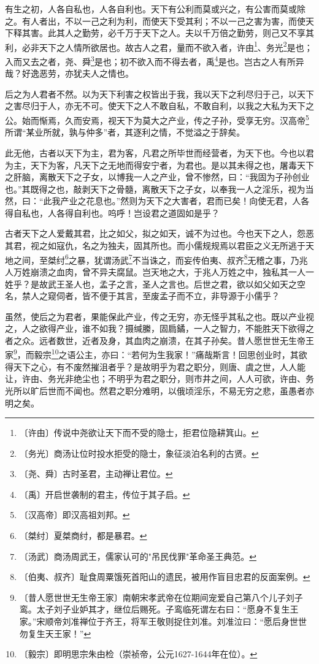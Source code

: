 \documentclass[12pt,UTF-8,openany,a4]{ctexbook}
\begin{document}
\begin{large}
    
    有生之初，人各自私也，人各自利也。天下有公利而莫或兴之，有公害而莫或除之。有人者出，不以一己之利为利，而使天下受其利；不以一己之害为害，而使天下释其害。此其人之勤劳，必千万于天下之人。夫以千万倍之勤劳，则己又不享其利，必非天下之人情所欲居也。故古人之君，量而不欲入者，许由\footnote{〔许由〕\yiwen 传说中尧欲让天下而不受的隐士，拒君位隐耕箕山。}、务光\footnote{〔务光〕\yiwen 商汤让位时投水拒受的隐士，象征淡泊名利的古贤。}是也；入而又去之者，尧、舜\footnote{〔尧、舜〕\yiwen 古时圣君，主动禅让君位。}是也；初不欲入而不得去者，禹\footnote{〔禹〕\yiwen 开启世袭制的君主，传位于其子启。}是也。岂古之人有所异哉？好逸恶劳，亦犹夫人之情也。
    
    后之为人君者不然。以为天下利害之权皆出于我，我以天下之利尽归于己，以天下之害尽归于人，亦无不可。使天下之人不敢自私，不敢自利，以我之大私为天下之公。始而惭焉，久而安焉，视天下为莫大之产业，传之子孙，受享无穷。汉高帝\footnote{〔汉高帝〕\yiwen 即汉高祖刘邦。}所谓“某业所就，孰与仲多”者，其逐利之情，不觉溢之于辞矣。
    
    此无他，古者以天下为主，君为客，凡君之所毕世而经营者，为天下也。今也以君为主，天下为客，凡天下之无地而得安宁者，为君也。是以其未得之也，屠毒天下之肝脑，离散天下之子女，以博我一人之产业，曾不惨然，曰：“我固为子孙创业也。”其既得之也，敲剥天下之骨髓，离散天下之子女，以奉我一人之淫乐，视为当然，曰：“此我产业之花息也。”然则为天下之大害者，君而已矣！向使无君，人各得自私也，人各得自利也。呜呼！岂设君之道固如是乎？
    
    古者天下之人爱戴其君，比之如父，拟之如天，诚不为过也。今也天下之人，怨恶其君，视之如寇仇，名之为独夫，固其所也。而小儒规规焉以君臣之义无所逃于天地之间，至桀纣\footnote{〔桀纣〕\yiwen 夏桀商纣，都是暴君。}之暴，犹谓汤武\footnote{〔汤武〕\yiwen 商汤周武王，儒家认可的"吊民伐罪"革命圣王典范。}不当诛之，而妄传伯夷、叔齐\footnote{〔伯夷、叔齐〕\yiwen 耻食周粟饿死首阳山的遗民，被用作盲目忠君的反面案例。}无稽之事，乃兆人万姓崩溃之血肉，曾不异夫腐鼠。岂天地之大，于兆人万姓之中，独私其一人一姓乎？是故武王圣人也，孟子之言，圣人之言也。后世之君，欲以如父如天之空名，禁人之窥伺者，皆不便于其言，至废孟子而不立，非导源于小儒乎？
    
    虽然，使后之为君者，果能保此产业，传之无穷，亦无怪乎其私之也。既以产业视之，人之欲得产业，谁不如我？摄缄縢，固扃鐍，一人之智力，不能胜天下欲得之者之众。远者数世，近者及身，其血肉之崩溃，在其子孙矣。昔人愿世世无生帝王家\footnote{〔昔人愿世世无生帝王家〕\yiwen 南朝宋孝武帝在位期间宠爱自己第八个儿子刘子鸾。太子刘子业妒其才，继位后赐死。子鸾临死谓左右曰：“愿身不复生王家。”宋顺帝刘准禅位于齐王，将军王敬则捉住刘准。刘准泣曰：“愿后身世世勿复生天王家！”}，而毅宗\footnote{〔毅宗〕\yiwen 即明思宗朱由检（崇祯帝，公元1627-1644年在位）。}之语公主，亦曰：“若何为生我家！”痛哉斯言！回思创业时，其欲得天下之心，有不废然摧沮者乎？是故明乎为君之职分，则唐、虞之世，人人能让，许由、务光非绝尘也；不明乎为君之职分，则市井之间，人人可欲，许由、务光所以旷后世而不闻也。然君之职分难明，以俄顷淫乐，不易无穷之悲，虽愚者亦明之矣。
\end{large}
\end{document}

